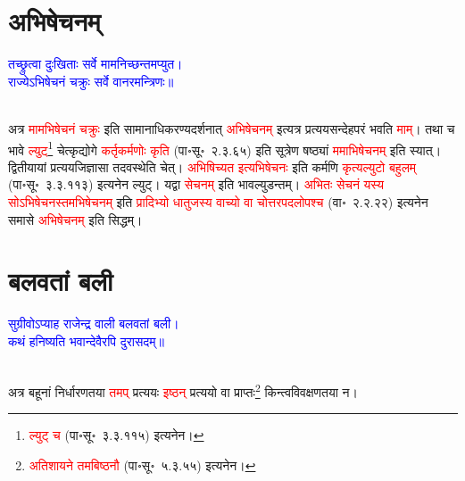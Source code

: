 \section[अभिषेचनम्]{अभिषेचनम्}
\centering\textcolor{blue}{तच्छ्रुत्वा दुःखिताः सर्वे मामनिच्छन्तमप्युत।\nopagebreak\\
राज्येऽभिषेचनं चक्रुः सर्वे वानरमन्त्रिणः॥}\nopagebreak\\
\\
\begin{sloppypar}\justifying\noindent\hspace{10mm} अत्र \textcolor{red}{मामभिषेचनं चक्रुः} इति सामानाधिकरण्य\-दर्शनात् \textcolor{red}{अभिषेचनम्} इत्यत्र प्रत्यय\-सन्देह\-परं भवति \textcolor{red}{माम्}। तथा च भावे \textcolor{red}{ल्युट्}\footnote{\textcolor{red}{ल्युट् च} (पा॰सू॰~३.३.११५) इत्यनेन।} चेत्कृद्योगे \textcolor{red}{कर्तृ\-कर्मणोः कृति} (पा॰सू॰~२.३.६५) इति सूत्रेण षष्ठ्यां \textcolor{red}{ममाभिषेचनम्} इति स्यात्। द्वितीयायां प्रत्यय\-जिज्ञासा तदवस्थेति चेत्।
\textcolor{red}{अभिषिच्यत इत्यभिषेचनः} इति कर्मणि \textcolor{red}{कृत्य\-ल्युटो बहुलम्} (पा॰सू॰~३.३.११३) इत्यनेन ल्युट्। यद्वा \textcolor{red}{सेचनम्} इति भाव\-ल्युडन्तम्। \textcolor{red}{अभितः सेचनं यस्य सोऽभिषेचनस्तमभिषेचनम्} इति \textcolor{red}{प्रादिभ्यो धातुजस्य वाच्यो वा चोत्तरपद\-लोपश्च} (वा॰~२.२.२२) इत्यनेन समासे \textcolor{red}{अभिषेचनम्} इति सिद्धम्।\end{sloppypar}
\section[बलवतां बली]{बलवतां बली}
\centering\textcolor{blue}{सुग्रीवोऽप्याह राजेन्द्र वाली बलवतां बली।\nopagebreak\\
कथं हनिष्यति भवान्देवैरपि दुरासदम्॥}\nopagebreak\\
\\
\begin{sloppypar}\justifying\noindent\hspace{10mm} अत्र बहूनां निर्धारणतया \textcolor{red}{तमप्} प्रत्ययः \textcolor{red}{इष्ठन्} प्रत्ययो वा प्राप्तः\footnote{\textcolor{red}{अतिशायने तमबिष्ठनौ} (पा॰सू॰~५.३.५५) इत्यनेन।} किन्त्वविवक्षणतया न।\end{sloppypar}
